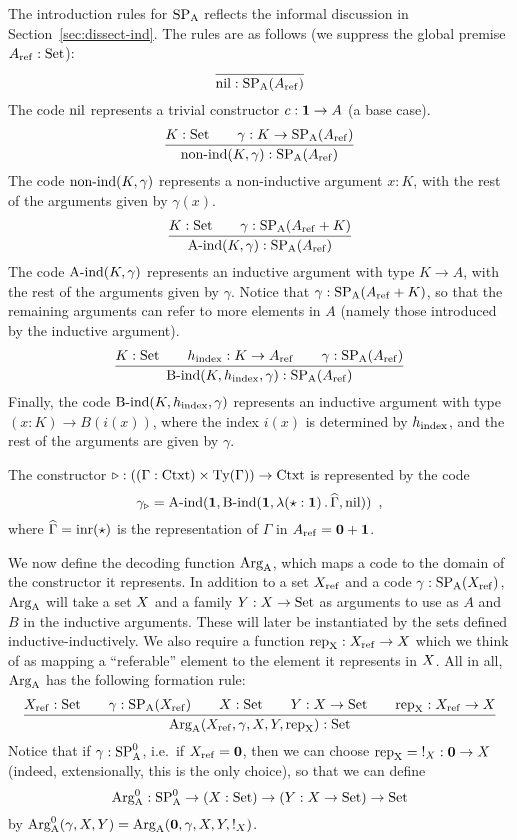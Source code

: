 \documentclass{article}
\begin{document}
The introduction rules for $\text{SP}_{\mathrm{A}}$ reflects the informal discussion in
Section~\ref{sec:dissect-ind}. The rules are as follows (we suppress
the global premise $A_{\mathrm{ref}} : \text{Set}$):
\[
\infer{\nilA : \SPA(\Aref)}{}
\]
%
The code $\text{nil}$ represents a trivial constructor $c : \mathbf{1} \to A$ (a base case).
%
\[
\infer{\nonindA(K, \gamma) : \SPA(\Aref)}{K : \Set & \quad \gamma : K \to \SPA(\Aref)}
\]
%
The code $\text{non-ind}(K, \gamma)$ represents a non-inductive argument $x
: K$, with the rest of the arguments given by $\gamma(x)$.
%
\[
\infer{\AindA(K, \gamma) : \SPA(\Aref)}{K : \Set & \quad \gamma : \SPA(\Aref + K)}
\]
%
The code $\text{A-ind}(K, \gamma)$ represents an inductive argument with
type $K \to A$, with the rest of the arguments given by
$\gamma$. Notice that $\gamma : \text{SP}_{\mathrm{A}}(A_{\mathrm{ref}} + K)$, so that the
remaining arguments can refer to more elements in $A$ (namely those
introduced by the inductive argument).
%
\[
\infer{\BindA(K, \hindex, \gamma) : \SPA(\Aref)}{K : \Set & \quad \hindex : K \to \Aref & \quad \gamma : \SPA(\Aref)}
\]
%
Finally, the code $\text{B-ind}(K, h_{\mathrm{index}}, \gamma)$ represents an inductive
argument with type $(x : K) \to B(i(x))$, where the index $i(x)$ is
determined by $h_{\mathrm{index}}$, and the rest of the arguments are given by
$\gamma$.
%

\begin{example}
  The constructor $\triangleright : ((\Gamma : \text{Ctxt}) \times \text{Ty}(\Gamma))
  \to \text{Ctxt}$ is represented by the code
\[
\gamma_{\triangleright} = \text{A-ind}(\mathbf{1}, \text{B-ind}(\mathbf{1}, \lambda (\star : \mathbf{1})\,.\,\widehat{\Gamma}, \text{nil})) \enspace ,
\]
where $\widehat{\Gamma} = \text{inr}(\star)$ is the representation of $\Gamma$ in $A_{\mathrm{ref}} = \mathbf{0} + \mathbf{1}$.
\blackqed
\end{example}

We now define the decoding function $\text{Arg}_{\mathrm{A}}$, which maps a code to the
domain of the constructor it represents. In addition to a set $X_{\mathrm{ref}}$
and a code $\gamma : \text{SP}_{\mathrm{A}}(X_{\mathrm{ref}})$, $\text{Arg}_{\mathrm{A}}$ will take a set $X$ and a
family $Y : X \to \text{Set}$ as arguments to use as $A$ and $B$ in the
inductive arguments. These will later be instantiated by the sets
defined inductive-inductively. We also require a function $\text{rep}_{\mathrm{X}} :
X_{\mathrm{ref}} \to X$ which we think of as mapping a ``referable'' element to
the element it represents in $X$. All in all, $\text{Arg}_{\mathrm{A}}$ has the
following formation rule:
%
\[
\infer{\ArgA(\Xref, \gamma, \A, \B, \repA) : \Set}{\Xref : \Set
                                         & \quad \gamma : \SPA(\Xref)
                                         & \quad \A : \Set
                                         & \quad \B : \A \to \Set
                                         & \quad \repA : \Xref \to \A}
\]
%
Notice that if $\gamma : \text{SP}^{0}_{\mathrm{A}}$, i.e.\ if $X_{\mathrm{ref}} = \mathbf{0}$, then we can
choose $\text{rep}_{\mathrm{X}} = {} !_{X} : \mathbf{0} \to X$ (indeed, extensionally,
this is the only choice), so that we can define
\[
\text{Arg}^{0}_{\mathrm{A}} : \text{SP}^{0}_{\mathrm{A}} \to (X : \text{Set}) \to (Y : X \to \text{Set}) \to \text{Set}
\]
by $\text{Arg}^{0}_{\mathrm{A}}(\gamma, X, Y) = \text{Arg}_{\mathrm{A}}(\mathbf{0}, \gamma, X, Y, !_{X})$.
\end{document}
